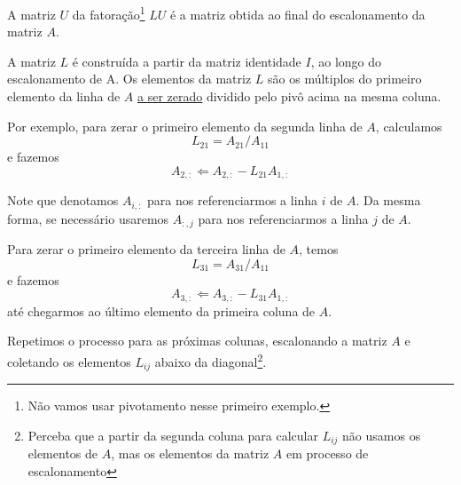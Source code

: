 A matriz $U$ da fatoração\footnote{Não vamos usar pivotamento nesse primeiro exemplo.} $LU$ é a matriz obtida ao final do escalonamento da matriz $A$.

A matriz $L$ é construída  a partir da matriz identidade $I$, ao longo do escalonamento de A. Os elementos da matriz $L$ são os múltiplos do primeiro elemento da linha de $A$ \underline{a ser zerado} dividido pelo pivô acima na mesma coluna.

Por exemplo, para zerar o primeiro elemento da segunda linha de $A$, calculamos
$$L_{21} = A_{21}/A_{11}$$
e fazemos 
$$A_{2,:} \Leftarrow A_{2,:} - L_{21}A_{1,:}$$

Note que denotamos $A_{i,:}$ para nos referenciarmos a linha $i$ de $A$. Da mesma forma, se necessário usaremos $A_{:,j}$ para nos referenciarmos a linha $j$ de $A$.

Para zerar o primeiro elemento da terceira linha de $A$, temos
$$L_{31}=A_{31}/A_{11}$$
e fazemos 
$$A_{3,:} \Leftarrow A_{3,:} - L_{31}A_{1,:}$$
até chegarmos ao último elemento da primeira coluna de $A$.

Repetimos o processo para as próximas colunas, escalonando a matriz $A$ e coletando os elementos $L_{ij}$ abaixo da diagonal\footnote{Perceba que a partir da segunda coluna para calcular $L_{ij}$ não usamos os elementos de $A$, mas os elementos da matriz $A$ em processo de escalonamento}.

